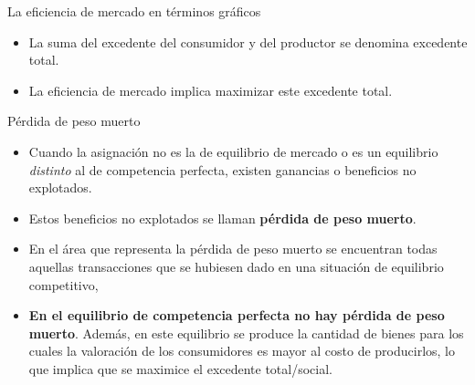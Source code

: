 \documentclass{beamer}
\begin{document}
\begin{frame}{La eficiencia de mercado en términos gráficos}
  \begin{itemize}
    \item La suma del excedente del consumidor y del productor se denomina excedente total.
    \item La eficiencia de mercado implica maximizar este excedente total.
  \end{itemize}
\begin{figure}[H]
    \begin{center}
    \end{center}
    \end{figure}
\end{frame}

\begin{frame}{Pérdida de peso muerto}
  \begin{itemize}
    \item Cuando la asignación no es la de equilibrio de mercado o es un equilibrio \textit{distinto} al de competencia perfecta, existen ganancias o beneficios no explotados.
     \item Estos beneficios no explotados se llaman \textbf{pérdida de peso muerto}. 
     \item En el área que representa la pérdida de peso muerto se encuentran todas aquellas transacciones que se hubiesen dado en una situación de equilibrio competitivo,
     \item \textbf{En el equilibrio de competencia perfecta no hay pérdida de peso muerto}. Además, en este equilibrio se produce la cantidad de bienes para los cuales la valoración de los consumidores es mayor al costo de producirlos, lo que implica que se maximice el excedente total/social.
    \end{itemize}
\end{frame}
\end{document}
